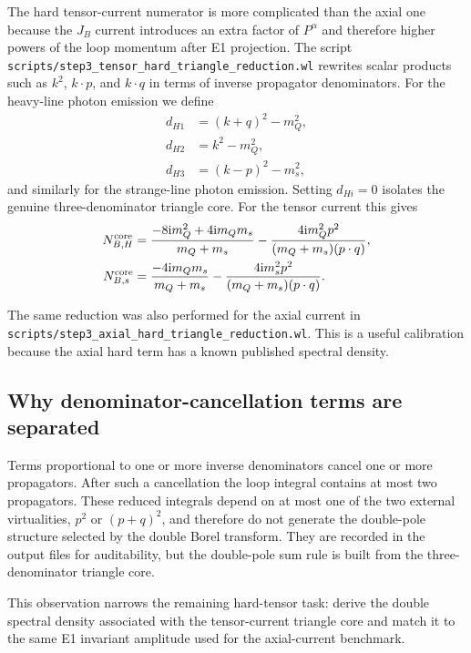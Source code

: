 \documentclass[11pt]{article}
\newcommand{\ii}{\mathrm{i}}
\begin{document}
The hard tensor-current numerator is more complicated than the axial one because
the $J_B$ current introduces an extra factor of $P^\alpha$ and therefore higher
powers of the loop momentum after E1 projection.  The script
\texttt{scripts/step3\_tensor\_hard\_triangle\_reduction.wl} rewrites scalar
products such as $k^2$, $k\cdot p$, and $k\cdot q$ in terms of inverse
propagator denominators.  For the heavy-line photon emission we define
\begin{align}
  d_{H1}&=(k+q)^2-m_Q^2,\\
  d_{H2}&=k^2-m_Q^2,\\
  d_{H3}&=(k-p)^2-m_s^2,
\end{align}
and similarly for the strange-line photon emission.  Setting
$d_{Hi}=0$ isolates the genuine three-denominator triangle core.  For the
tensor current this gives
\begin{align}
  N_{B,H}^{\rm core}
  &=
  \frac{-8\ii m_Q^2+4\ii m_Qm_s}{m_Q+m_s}
  -
  \frac{4\ii m_Q^2 p^2}{(m_Q+m_s)(p\cdot q)},\\
  N_{B,s}^{\rm core}
  &=
  \frac{-4\ii m_Qm_s}{m_Q+m_s}
  -
  \frac{4\ii m_s^2 p^2}{(m_Q+m_s)(p\cdot q)}.
\end{align}

The same reduction was also performed for the axial current in
\texttt{scripts/step3\_axial\_hard\_triangle\_reduction.wl}.  This is a useful
calibration because the axial hard term has a known published spectral density.

\subsection{Why denominator-cancellation terms are separated}

Terms proportional to one or more inverse denominators cancel one or more
propagators.  After such a cancellation the loop integral contains at most two
propagators.  These reduced integrals depend on at most one of the two external
virtualities, $p^2$ or $(p+q)^2$, and therefore do not generate the double-pole
structure selected by the double Borel transform.  They are recorded in the
output files for auditability, but the double-pole sum rule is built from the
three-denominator triangle core.

This observation narrows the remaining hard-tensor task: derive the double
spectral density associated with the tensor-current triangle core and match it
to the same E1 invariant amplitude used for the axial-current benchmark.
\end{document}
